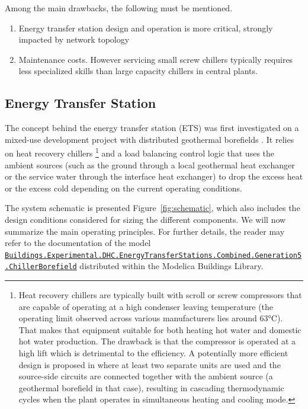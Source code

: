 Among the main drawbacks, the following must be mentioned.
\begin{enumerate}
    \item Energy transfer station design and operation is more critical, strongly impacted by network topology

    \item Maintenance costs. However servicing small screw chillers typically requires less specialized skills than large capacity chillers in central plants.
\end{enumerate}


\subsection{Energy Transfer Station} \label{sec:ets}

The concept behind the energy transfer station (ETS) was first investigated on a mixed-use development project with distributed geothermal borefields \citep{WetterHu2019}.
It relies on heat recovery chillers%
\footnote{Heat recovery chillers are typically built with scroll or screw compressors that are capable of operating at a high condenser leaving temperature (the operating limit observed across various manufacturers lies around 63°C). That makes that equipment suitable for both heating hot water and domestic hot water production. The drawback is that the compressor is operated at a high lift which is detrimental to the efficiency. A potentially more efficient design is proposed in \cite{Cline2020} where at least two separate units are used and the source-side circuits are connected together with the ambient source (a geothermal borefield in that case), resulting in cascading thermodynamic cycles when the plant operates in simultaneous heating and cooling mode.}
and a load balancing control logic that uses the ambient sources (such as the ground through a local geothermal heat exchanger or the service water through the interface heat exchanger) to drop the excess heat or the excess cold depending on the current operating conditions.

The system schematic is presented Figure~\ref{fig:schematic}, which also includes the design conditions considered for sizing the different components.
We will now summarize the main operating principles. For further details, the reader may refer to the documentation of the model \href{https://simulationresearch.lbl.gov/modelica/releases/v8.0.0/help/Buildings\_Experimental\_DHC\_EnergyTransferStations\_Combined\_Generation5.html#Buildings.Experimental.DHC.EnergyTransferStations.Combined.Generation5.ChillerBorefield}{\lstinline|Buildings.Experimental.DHC.EnergyTransferStations.Combined.Generation5.ChillerBorefield|} distributed within the Modelica Buildings Library.

